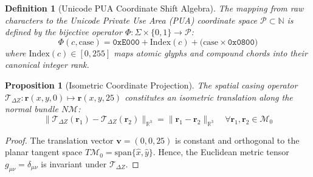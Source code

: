 \documentclass[11pt,oneside,letterpaper]{article}
\theoremstyle{sovereignstyle}
\newtheorem{definition}{Definition}[section]
\newtheorem{proposition}[theorem]{Proposition}
\begin{document}
\begin{definition}[Unicode PUA Coordinate Shift Algebra]
The mapping from raw characters to the Unicode Private Use Area (PUA) coordinate space $\mathcal{P} \subset \mathbb{N}$ is defined by the bijective operator $\Phi: \Sigma \times \{0, 1\} \to \mathcal{P}$:
\begin{equation}
\Phi(c, \text{case}) = \mathtt{0xE000} + \mathrm{Index}(c) + \big(\text{case} \times \mathtt{0x0800}\big)
\end{equation}
where $\mathrm{Index}(c) \in [0, 255]$ maps atomic glyphs and compound chords into their canonical integer rank.
\end{definition}

\begin{proposition}[Isometric Coordinate Projection]
The spatial casing operator $\mathcal{T}_{\Delta Z}: \mathbf{r}(x, y, 0) \mapsto \mathbf{r}(x, y, 25)$ constitutes an isometric translation along the normal bundle $N\mathcal{M}$:
\begin{equation}
\|\mathcal{T}_{\Delta Z}(\mathbf{r}_1) - \mathcal{T}_{\Delta Z}(\mathbf{r}_2)\|_{\mathbb{R}^3} = \|\mathbf{r}_1 - \mathbf{r}_2\|_{\mathbb{R}^3} \quad \forall \mathbf{r}_1, \mathbf{r}_2 \in \mathcal{M}_0
\end{equation}
\end{proposition}
\begin{proof}
The translation vector $\mathbf{v} = (0, 0, 25)$ is constant and orthogonal to the planar tangent space $T\mathcal{M}_0 = \text{span}\{\hat{x}, \hat{y}\}$. Hence, the Euclidean metric tensor $g_{\mu\nu} = \delta_{\mu\nu}$ is invariant under $\mathcal{T}_{\Delta Z}$.
\end{proof}
\end{document}
